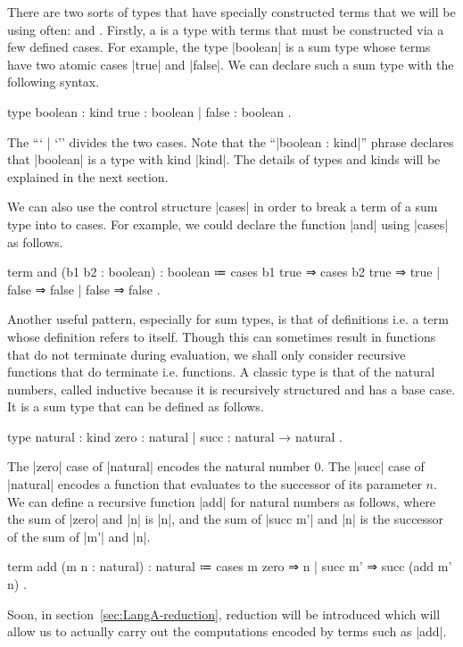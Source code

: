 There are two sorts of types that have specially constructed terms that we will be using often:  and .
Firstly, a  is a type with terms that must be constructed via a few defined cases.
For example, the type \code|boolean| is a sum type whose terms have two atomic cases \code|true| and \code|false|.
We can declare such a sum type with the following syntax.
%
\begin{snippet}
type boolean : kind
  { true  : boolean
  | false : boolean }.
\end{snippet}
%
The ``\code` | `'' divides the two cases.
Note that the ``\code|boolean : kind|'' phrase declares that \code|boolean| is a type with kind \code|kind|.
The details of types and kinds will be explained in the next section.

We can also use the control structure \code|cases| in order to break a term of a sum type into to cases.
For example, we could declare the function \code|and| using \code|cases| as follows.
%
\begin{snippet}
term and (b1 b2 : boolean) : boolean
  ≔ cases b1
      { true  ⇒ cases b2
                  { true  ⇒ true
                  | false ⇒ false }
      | false ⇒ false }.
\end{snippet}
%
Another useful pattern, especially for sum types, is that of  definitions i.e. a term whose definition refers to itself.
Though this can sometimes result in functions that do not terminate during evaluation, we shall only consider recursive functions that do terminate i.e.  functions.
A classic  type is that of the natural numbers, called inductive because it is recursively structured and has a base case.
It is a sum type that can be defined as follows.
%
\begin{snippet}
type natural : kind
  { zero : natural
  | succ : natural → natural }.
\end{snippet}
%
The \code|zero| case of \code|natural| encodes the natural number $0$.
The \code|succ| case of \code|natural| encodes a function that evaluates to the successor of its parameter $n$.
We can define a recursive function \code|add| for natural numbers as follows, where the sum of \code|zero| and \code|n| is \code|n|, and the sum of \code|succ m'| and \code|n| is the successor of the sum of \code|m'| and \code|n|.
%
\begin{snippet}
term add (m n : natural) : natural
  ≔ cases m
      { zero    ⇒ n
      | succ m' ⇒ succ (add m' n) }.
\end{snippet}
%
Soon, in section~\ref{sec:LangA-reduction}, reduction will be introduced which will allow us to actually carry out the computations encoded by terms such as \code|add|.

